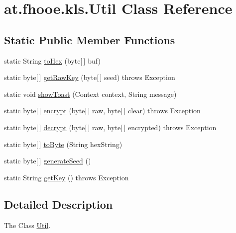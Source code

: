 \hypertarget{classat_1_1fhooe_1_1kls_1_1_util}{\section{at.\-fhooe.\-kls.\-Util Class Reference}
\label{classat_1_1fhooe_1_1kls_1_1_util}
}
\subsection*{Static Public Member Functions}
\begin{DoxyCompactItemize}
\item 
static String \hyperlink{classat_1_1fhooe_1_1kls_1_1_util_aa35b93eb337f44bde0a617f23fc87fe7}{to\-Hex} (byte\mbox{[}$\,$\mbox{]} buf)
\item 
static byte\mbox{[}$\,$\mbox{]} \hyperlink{classat_1_1fhooe_1_1kls_1_1_util_a690f3128e5679a55c80fe44940f51eb1}{get\-Raw\-Key} (byte\mbox{[}$\,$\mbox{]} seed)  throws Exception 
\item 
static void \hyperlink{classat_1_1fhooe_1_1kls_1_1_util_a39b50bf23b8d591cf8688565a0135b3b}{show\-Toast} (Context context, String message)
\item 
static byte\mbox{[}$\,$\mbox{]} \hyperlink{classat_1_1fhooe_1_1kls_1_1_util_a62622e2d33b0ab3ba497073a4e40c570}{encrypt} (byte\mbox{[}$\,$\mbox{]} raw, byte\mbox{[}$\,$\mbox{]} clear)  throws Exception 
\item 
static byte\mbox{[}$\,$\mbox{]} \hyperlink{classat_1_1fhooe_1_1kls_1_1_util_adf59bcfb0c962d12f71f7b5b4b64824d}{decrypt} (byte\mbox{[}$\,$\mbox{]} raw, byte\mbox{[}$\,$\mbox{]} encrypted)  throws Exception 
\item 
static byte\mbox{[}$\,$\mbox{]} \hyperlink{classat_1_1fhooe_1_1kls_1_1_util_ac457dbbbe9456c996ddbf15ea3a46141}{to\-Byte} (String hex\-String)
\item 
static byte\mbox{[}$\,$\mbox{]} \hyperlink{classat_1_1fhooe_1_1kls_1_1_util_ab6a9acc617b60d37df922624d59e3b53}{generate\-Seed} ()
\item 
static String \hyperlink{classat_1_1fhooe_1_1kls_1_1_util_a30995c53e5d796cf9af2074a774114f6}{get\-Key} ()  throws Exception
\end{DoxyCompactItemize}


\subsection{Detailed Description}
The Class \hyperlink{classat_1_1fhooe_1_1kls_1_1_util}{Util}. 

